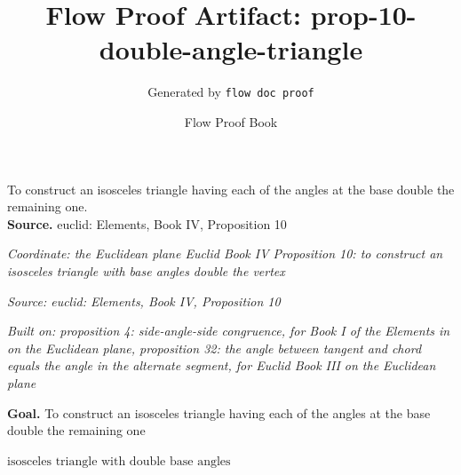 \documentclass[11pt]{article}
\title{Flow Proof Artifact: prop-10-double-angle-triangle}
\author{Generated by \texttt{flow doc proof}}
\date{Flow Proof Book}
\theoremstyle{definition}
\begin{document}
\maketitle
To construct an isosceles triangle having each of the angles at the base double the remaining one.\\[0.5em]
\textbf{Source.} euclid: Elements, Book IV, Proposition 10\\[0.5em]
\bigskip
{}\par
\smallskip\noindent\textit{Coordinate: the Euclidean plane \cdot Euclid Book IV \cdot Proposition 10: to construct an isosceles triangle with base angles double the vertex}\par
\smallskip\noindent\textit{Source: euclid: Elements, Book IV, Proposition 10}\par
\smallskip\noindent\textit{Built on: proposition 4: side-angle-side congruence, for Book I of the Elements in on the Euclidean plane, proposition 32: the angle between tangent and chord equals the angle in the alternate segment, for Euclid Book III on the Euclidean plane}\par
\medskip
\noindent\textbf{Goal.} To construct an isosceles triangle having each of the angles at the base double the remaining one\par
\noindent$\displaystyle \text{isosceles triangle with double base angles}$\par
\medskip
\noindent
\end{document}
